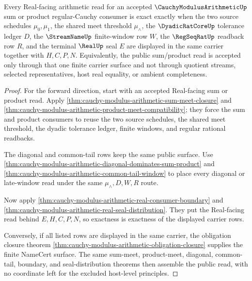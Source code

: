 \begin{theorem}
\label{thm:cauchy-modulus-arithmetic-public-exactness}
Every Real-facing arithmetic read for an accepted $\CauchyModulusArithmeticUp$ sum or product regular-Cauchy consumer is exact exactly when the two source schedules $\mu_0,\mu_1$, the shared meet threshold $\mu_{\wedge}$, the $\DyadicRatCoreUp$ tolerance ledger $D$, the $\StreamNameUp$ finite-window row $W$, the $\RegSeqRatUp$ readback row $R$, and the terminal $\RealUp$ seal $E$ are displayed in the same carrier together with $H,C,P,N$. Equivalently, the public sum/product read is accepted only through that one finite carrier surface and not through quotient streams, selected representatives, host real equality, or ambient completeness.
\end{theorem}
\begin{proof}
For the forward direction, start with an accepted Real-facing sum or product read. Apply \autoref{thm:cauchy-modulus-arithmetic-sum-meet-closure} and \autoref{thm:cauchy-modulus-arithmetic-product-meet-compatibility}; they force the sum and product consumers to reuse the two source schedules, the shared meet threshold, the dyadic tolerance ledger, finite windows, and regular rational readbacks.

The diagonal and common-tail rows keep the same public surface. Use \autoref{thm:cauchy-modulus-arithmetic-diagonal-dominates-sum-product} and \autoref{thm:cauchy-modulus-arithmetic-common-tail-window} to place every diagonal or late-window read under the same $\mu_{\wedge},D,W,R$ route.

Now apply \autoref{thm:cauchy-modulus-arithmetic-real-consumer-boundary} and \autoref{thm:cauchy-modulus-arithmetic-real-seal-distribution}. They put the Real-facing read behind $E,H,C,P,N$, so exactness is exactness of the displayed carrier rows.

Conversely, if all listed rows are displayed in the same carrier, the obligation closure theorem \autoref{thm:cauchy-modulus-arithmetic-obligation-closure} supplies the finite NameCert surface. The same sum-meet, product-meet, diagonal, common-tail, boundary, and seal-distribution theorems then assemble the public read, with no coordinate left for the excluded host-level principles.
\end{proof}

